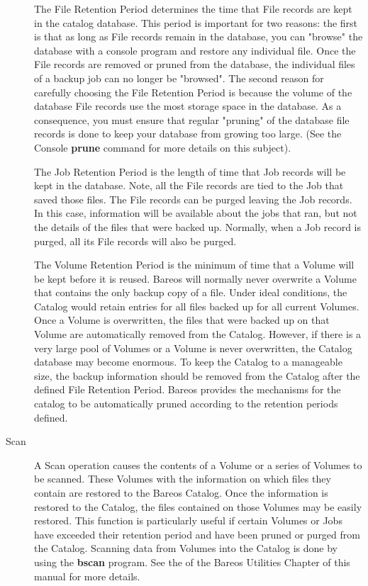 \begin{description}
   The File Retention Period determines the time that File records are kept
   in the catalog database.  This period is important for two reasons: the
   first is that as long as File records remain in the database, you
   can "browse" the database with a console program and restore any
   individual file. Once the File records are removed or pruned from the
   database, the individual files of a backup job can no longer be
   "browsed".  The second reason for carefully choosing the File Retention
   Period is because the volume of
   the database File records use the most storage space in the
   database.  As a consequence, you must ensure that regular "pruning" of
   the database file records is done to keep your database from growing
   too large. (See the Console {\bf prune}
   command for more details on this subject).

   The Job Retention Period is the length of time that Job records will be
   kept in the database.  Note, all the File records are tied to the Job
   that saved those files.  The File records can be purged leaving the Job
   records.  In this case, information will be available about the jobs
   that ran, but not the details of the files that were backed up.
   Normally, when a Job record is purged, all its File records will also be
   purged.

   The Volume Retention Period is the minimum of time that a Volume will be
   kept before it is reused.  Bareos will normally never overwrite a Volume
   that contains the only backup copy of a file.  Under ideal conditions,
   the Catalog would retain entries for all files backed up for all current
   Volumes.  Once a Volume is overwritten, the files that were backed up on
   that Volume are automatically removed from the Catalog.  However, if
   there is a very large pool of Volumes or a Volume is never overwritten,
   the Catalog database may become enormous.  To keep the Catalog to a
   manageable size, the backup information should be removed from the
   Catalog after the defined File Retention Period.  Bareos provides the
   mechanisms for the catalog to be automatically pruned according to the
   retention periods defined.

\item [Scan]
   A Scan operation causes the contents of a Volume or a series of Volumes
   to be scanned.  These Volumes with the information on which files they
   contain are restored to the Bareos Catalog.  Once the information is
   restored to the Catalog, the files contained on those Volumes may be
   easily restored.  This function is particularly useful if certain
   Volumes or Jobs have exceeded their retention period and have been
   pruned or purged from the Catalog.  Scanning data from Volumes into the
   Catalog is done by using the {\bf bscan} program.  See the  of the Bareos Utilities Chapter of this manual for more
   details.


\end{description}
